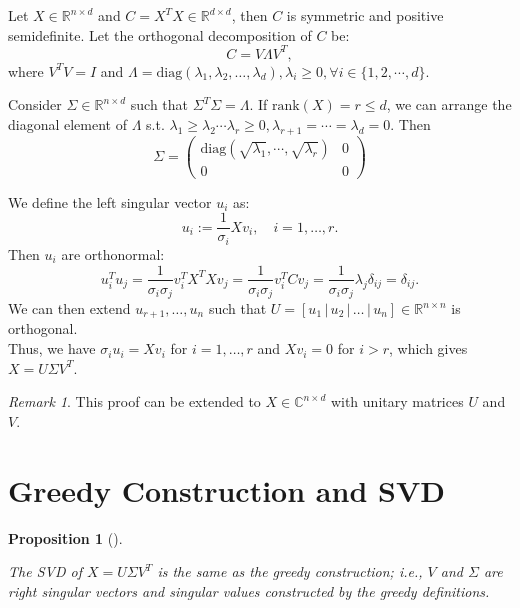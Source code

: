 \documentclass[
  letterpaper,
  DIV=11,
  numbers=noendperiod]{scrreprt}
\theoremstyle{definition}
\theoremstyle{plain}
\theoremstyle{plain}
\newtheorem{proposition}{Proposition}[chapter]
\theoremstyle{definition}
\theoremstyle{plain}
\theoremstyle{plain}
\theoremstyle{remark}
\newtheorem{refremark}{Remark}[chapter]
\begin{document}
\begin{refproof}
Let \(X \in \mathbb{R}^{n \times d}\) and
\(C = X^T X \in \mathbb{R}^{d \times d}\), then \(C\) is symmetric and
positive semidefinite. Let the orthogonal decomposition of \(C\) be: \[
C = V \Lambda V^T,
\] where \(V^T V = I\) and
\(\Lambda = \mathrm{diag}(\lambda_1, \lambda_2, \dots, \lambda_d), \lambda_i \geq 0 ,\forall i\in\{1, 2, \cdots, d\}\).

Consider \(\Sigma \in \mathbb{R}^{n \times d}\) such that
\(\Sigma^T \Sigma = \Lambda\). If \(\mathrm{rank}(X) = r \leq d\), we
can arrange the diagonal element of \(\Lambda\) s.t.
\(\lambda_1\geq\lambda_2\cdots\lambda_r\geq0,\lambda_{r+1} = \cdots=\lambda_d=0\).
Then \[
\Sigma = \begin{pmatrix}
\mathrm{diag}(\sqrt{\lambda_1},\cdots,\sqrt{\lambda_r}) & 0\\
0 & 0
\end{pmatrix}
\]

We define the left singular vector \(u_i\) as: \[
u_i := \frac{1}{\sigma_i} X v_i,\quad i = 1, \dots, r.
\] Then \(u_i\) are orthonormal: \[
u_i^T u_j = \frac{1}{\sigma_i \sigma_j} v_i^T X^T X v_j = \frac{1}{\sigma_i \sigma_j} v_i^T C v_j = \frac{1}{\sigma_i \sigma_j} \lambda_j \delta_{ij} = \delta_{ij}.
\] We can then extend \(u_{r+1}, \dots, u_n\) such that
\(U = [u_1\,|\,u_2\,|\,\dots\,|\,u_n] \in \mathbb{R}^{n\times n}\) is
orthogonal.\\
Thus, we have \(\sigma_i u_i = X v_i\) for \(i=1,\ldots, r\) and
\(X v_i = 0\) for \(i > r\), which gives \(X = U \Sigma V^T\).

\label{prf-SVD}

\end{refproof}

\begin{refremark}
This proof can be extended to \(X \in \mathbb{C}^{n \times d}\) with
unitary matrices \(U\) and \(V\).

\label{rem-svd-complex}

\end{refremark}

\section{Greedy Construction and SVD}\label{greedy-construction-and-svd}

\begin{proposition}[]\protect\hypertarget{prp-svd-greedy}{}\label{prp-svd-greedy}

The SVD of \(X = U \Sigma V^T\) is the same as the greedy construction;
i.e., \(V\) and \(\Sigma\) are right singular vectors and singular
values constructed by the greedy definitions.

\end{proposition}
\end{document}
